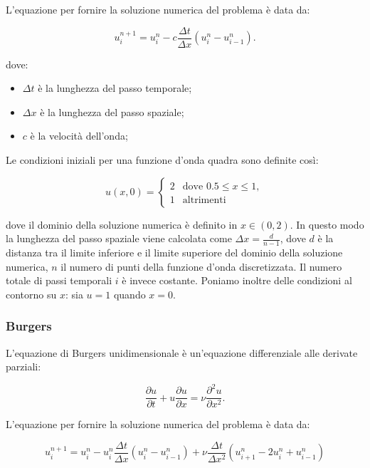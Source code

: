 \noindent
L’equazione per fornire la soluzione numerica del problema è data da:

\begin{equation}
u_i^{n+1} = u_i^n - c \frac{\Delta t}{\Delta x}(u_i^n-u_{i-1}^n).
\end{equation}

\noindent
dove:
\begin{itemize}
\item $\Delta t$ è la lunghezza del passo temporale;
\item $\Delta x$ è la lunghezza del passo spaziale;
\item $c$ è la velocità dell'onda;
\end{itemize}


\noindent
Le condizioni iniziali per una funzione d’onda quadra sono definite così:

\begin{equation}
u(x,0)=\begin{cases}2 & \text{dove } 0.5\leq x \leq 1,\\
1 & \text{altrimenti} 
\end{cases}
\end{equation}

\noindent
dove il dominio della soluzione numerica è definito in $x\in(0,2)$. In questo modo la lunghezza del passo spaziale viene calcolata come $\Delta x = \frac{d}{n - 1}$, dove $d$ è la distanza tra il limite inferiore e il limite superiore del dominio della soluzione numerica, $n$ il numero di punti della funzione d'onda discretizzata. Il numero totale di passi temporali $i$ è invece costante.
\noindent
Poniamo inoltre delle condizioni al contorno su $x$: sia $u = 1$ quando $x = 0$.

\subsubsection*{Burgers}
L’equazione di Burgers unidimensionale è un’equazione differenziale alle derivate parziali: 

\begin{equation}
\frac{\partial u}{\partial t} + u \frac{\partial u}{\partial x} = \nu \frac{\partial ^2u}{\partial x^2}.
\end{equation}

\noindent
L’equazione per fornire la soluzione numerica del problema è data da: 

\begin{equation}
u_i^{n+1} = u_i^n - u_i^n \frac{\Delta t}{\Delta x} (u_i^n - u_{i-1}^n) + \nu \frac{\Delta t}{\Delta x^2}(u_{i+1}^n - 2u_i^n + u_{i-1}^n)
\end{equation}

